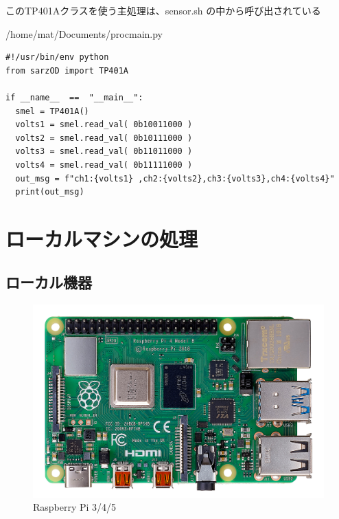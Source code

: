 \documentclass[12pt,a4paper,uplatex]{jsbook}
\begin{document}
このTP401Aクラスを使う主処理は、sensor.sh の中から呼び出されている

\begin{itembox}[l]{/home/mat/Documents/procmain.py}
	\begin{verbatim}
#!/usr/bin/env python
from sarzOD import TP401A

if __name__  ==  "__main__":
  smel = TP401A()
  volts1 = smel.read_val( 0b10011000 ) 
  volts2 = smel.read_val( 0b10111000 ) 
  volts3 = smel.read_val( 0b11011000 ) 
  volts4 = smel.read_val( 0b11111000 )
  out_msg = f"ch1:{volts1} ,ch2:{volts2},ch3:{volts3},ch4:{volts4}" 
  print(out_msg)
	\end{verbatim}
\end{itembox}

\section{ローカルマシンの処理}

\subsection{ローカル機器}

\begin{figure}[H]
	\begin{minipage}[b]{1.0\linewidth}
		\centering
		\includegraphics[keepaspectratio, scale=0.12]{figs/jpg/udrp4b_front.jpg}
		\caption{Raspberry Pi 3/4/5}
	\end{minipage}
\end{figure}
\end{document}
